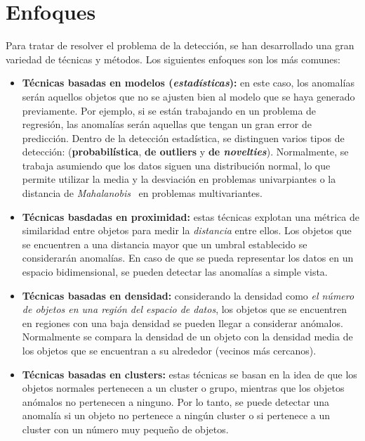 \section{Enfoques}
Para tratar de resolver el problema de la detección, se han desarrollado una gran variedad de
técnicas y métodos. Los siguientes enfoques son los más comunes:
\begin{itemize}[topsep=0pt]
	\item \textbf{Técnicas basadas en modelos (\textit{estadísticas}):} en este caso, los anomalías serán aquellos objetos
		que no se ajusten bien al modelo que se haya generado previamente. Por ejemplo, si se
		están trabajando en un problema de regresión, las anomalías serán aquellas que tengan un
		gran error de predicción. Dentro de la detección estadística, se distinguen varios tipos de detección:
		(\textbf{probabilística}, \textbf{de outliers} y \textbf{de \textit{novelties}}). Normalmente, se trabaja
		asumiendo que los datos siguen una distribución normal, lo que permite utilizar la media y la desviación
		en problemas univarpiantes o la distancia de \emph{Mahalanobis}~\cite{mahalanobis2018generalized} en
		problemas multivariantes.

		\begin{minipage}{\linewidth}
			\centering
			\label{fig:fig2}
		\end{minipage}
	\item \textbf{Técnicas basdadas en proximidad:} estas técnicas explotan una métrica de
		similaridad entre objetos para medir la \textit{distancia} entre ellos. Los objetos que
		se encuentren a una distancia mayor que un umbral establecido se considerarán anomalías.
		En caso de que se pueda representar los datos en un espacio bidimensional, se pueden
		detectar las anomalías a simple vista.
	\item \textbf{Técnicas basadas en densidad:} considerando la densidad como \emph{el número de
		objetos en una región del espacio de datos}, los objetos que se encuentren en regiones
		con una baja densidad se pueden llegar a considerar anómalos. Normalmente se compara la
		densidad de un objeto con la densidad media de los objetos que se encuentran a su alrededor
		(vecinos más cercanos).
	\item \textbf{Técnicas basadas en clusters:} estas técnicas se basan en la idea de que los
		objetos normales pertenecen a un cluster o grupo, mientras que los objetos anómalos no
		pertenecen a ninguno. Por lo tanto, se puede detectar una anomalía si un objeto no pertenece
		a ningún cluster o si pertenece a un cluster con un número muy pequeño de objetos.
\end{itemize}


